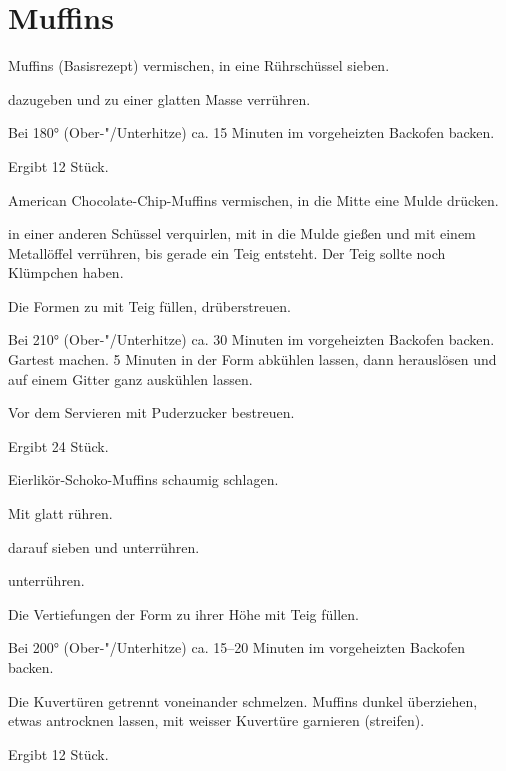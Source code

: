 \section{Muffins}

\begin{recipe}{Muffins (Basisrezept)}
  vermischen, in eine Rührschüssel sieben.
  
  dazugeben und zu einer glatten Masse verrühren.

  Bei 180° (Ober-"/Unterhitze) ca. 15 Minuten im vorgeheizten
  Backofen backen.
  
  Ergibt 12 Stück.
\end{recipe}
  
\begin{recipe}{American Chocolate-Chip-Muffins}
  vermischen, in die Mitte eine Mulde drücken.

  in einer anderen Schüssel verquirlen, mit
  in die Mulde gießen und mit einem Metallöffel verrühren, bis gerade
  ein Teig entsteht. Der Teig sollte noch Klümpchen haben.
  
  Die Formen zu  mit Teig füllen,
  drüberstreuen.

  Bei 210° (Ober-"/Unterhitze) ca. 30 Minuten im vorgeheizten
  Backofen backen. Gartest machen. 5 Minuten in der Form
  abkühlen lassen, dann herauslösen und auf einem Gitter ganz
  auskühlen lassen.

  Vor dem Servieren mit Puderzucker bestreuen.
  
  Ergibt 24 Stück.
\end{recipe}

\begin{recipe}{Eierlikör-Schoko-Muffins}
  schaumig schlagen.

  Mit
  glatt rühren.
  
  darauf sieben und unterrühren.
  
  unterrühren.

  Die Vertiefungen der Form zu  ihrer Höhe mit Teig füllen.
  
  Bei 200° (Ober-"/Unterhitze) ca. 15--20 Minuten im vorgeheizten
  Backofen backen.

  Die Kuvertüren getrennt voneinander schmelzen. Muffins dunkel überziehen,
  etwas antrocknen lassen, mit weisser Kuvertüre garnieren (streifen).

  Ergibt 12 Stück.
\end{recipe}

